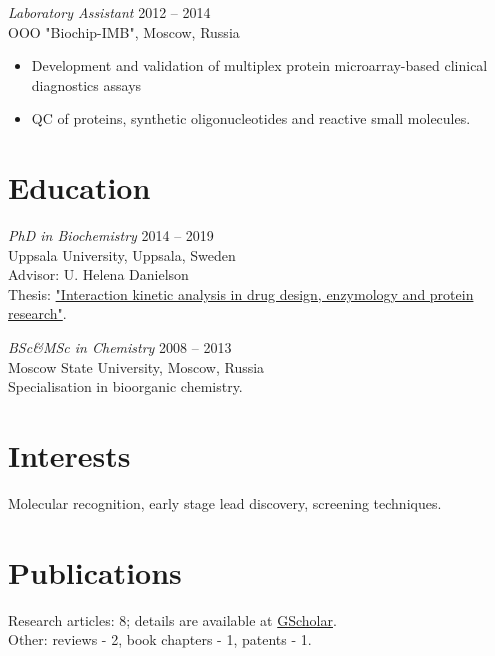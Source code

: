 \documentclass[margin]{res}
\begin{document}
\begin{resume}
{\sl Laboratory Assistant} \hfill 2012 -- 2014 \\
OOO "Biochip-IMB", Moscow, Russia
\begin{itemize}
\setlength\itemsep{0em}
\item Development and validation of multiplex protein microarray-based clinical diagnostics assays
\item QC of proteins, synthetic oligonucleotides and reactive small molecules.
\end{itemize}
 
\section{Education} {\sl PhD in Biochemistry} \hfill 2014 -- 2019 \\
Uppsala University, Uppsala, Sweden \\
Advisor: U. Helena Danielson \\
Thesis: \href{http://uu.diva-portal.org/smash/record.jsf?pid=diva2%3A1256395&dswid=214}{"Interaction kinetic analysis in drug design, enzymology and protein research"}.

{\sl BSc\&MSc in Chemistry} \hfill 2008 -- 2013 \\
Moscow State University, Moscow, Russia \\
Specialisation in bioorganic chemistry.
                
\section{Interests} Molecular recognition, early stage lead discovery, screening techniques.
 


\newpage

\section{Publications}
\nocite{*}
Research articles: 8; details are available at \href{https://scholar.google.com/citations?hl=sv&user=H5uK2zsAAAAJ&view_op=list_works&authuser=2&sortby=pubdate}{GScholar}.\\
Other: reviews - 2, book chapters - 1, patents  - 1.\\
\printbibliography[heading=none]
\end{resume}
\end{document}
